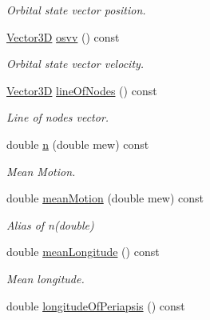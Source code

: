 \begin{DoxyCompactItemize}
\begin{DoxyCompactList}\small\item\em Orbital state vector position. \end{DoxyCompactList}\item 
\hypertarget{class_orbit3_d_a73b48753675733e273a36faf2291eefa}{\hyperlink{class_vector3_d}{Vector3\+D} \hyperlink{class_orbit3_d_a73b48753675733e273a36faf2291eefa}{osvv} () const }\label{class_orbit3_d_a73b48753675733e273a36faf2291eefa}

\begin{DoxyCompactList}\small\item\em Orbital state vector velocity. \end{DoxyCompactList}\item 
\hypertarget{class_orbit3_d_a0c48a720152f61990498eb8ceb79a8a7}{\hyperlink{class_vector3_d}{Vector3\+D} \hyperlink{class_orbit3_d_a0c48a720152f61990498eb8ceb79a8a7}{line\+Of\+Nodes} () const }\label{class_orbit3_d_a0c48a720152f61990498eb8ceb79a8a7}

\begin{DoxyCompactList}\small\item\em Line of nodes vector. \end{DoxyCompactList}\item 
\hypertarget{class_orbit3_d_a9319326e1a214e644fc383c898713ef6}{double \hyperlink{class_orbit3_d_a9319326e1a214e644fc383c898713ef6}{n} (double mew) const }\label{class_orbit3_d_a9319326e1a214e644fc383c898713ef6}

\begin{DoxyCompactList}\small\item\em Mean Motion. \end{DoxyCompactList}\item 
\hypertarget{class_orbit3_d_a8fd3eb6ad07a8111f4746dd3be6d86a2}{double \hyperlink{class_orbit3_d_a8fd3eb6ad07a8111f4746dd3be6d86a2}{mean\+Motion} (double mew) const }\label{class_orbit3_d_a8fd3eb6ad07a8111f4746dd3be6d86a2}

\begin{DoxyCompactList}\small\item\em Alias of n(double) \end{DoxyCompactList}\item 
\hypertarget{class_orbit3_d_a5c045adcbffa82f43988d25d0962bf5f}{double \hyperlink{class_orbit3_d_a5c045adcbffa82f43988d25d0962bf5f}{mean\+Longitude} () const }\label{class_orbit3_d_a5c045adcbffa82f43988d25d0962bf5f}

\begin{DoxyCompactList}\small\item\em Mean longitude. \end{DoxyCompactList}\item 
\hypertarget{class_orbit3_d_af04e2f2b465bbf37ab97d045c88effda}{double \hyperlink{class_orbit3_d_af04e2f2b465bbf37ab97d045c88effda}{longitude\+Of\+Periapsis} () const }\label{class_orbit3_d_af04e2f2b465bbf37ab97d045c88effda}


\end{DoxyCompactItemize}
